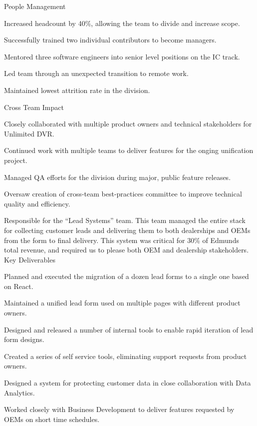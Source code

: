 \documentclass[]{deedy-resume-openfont}
\begin{document}
\sectionsep
People Management
\begin{tightemize}
\item Increased headcount by 40\%, allowing the team to divide and increase scope.
\item Successfully trained two individual contributors to become managers.
\item Mentored three software engineers into senior level positions on the IC track.
\item Led team through an unexpected transition to remote work.
\item Maintained lowest attrition rate in the division.
\end{tightemize}
\sectionsep

Cross Team Impact
\begin{tightemize}
\item Closely collaborated with multiple product owners and technical stakeholders for Unlimited DVR.
\item Continued work with multiple teams to deliver features for the onging unification project.
\item Managed QA efforts for the division during major, public feature releases.
\item Oversaw creation of cross-team best-practices committee to improve technical quality and efficiency.
\end{tightemize}
\sectionsep

\vspace{\topsep}
Responsible for the ``Lead Systems'' team. This team managed the entire stack for collecting customer leads and delivering them to both dealerships and OEMs from the form to final delivery. This system was critical for 30\% of Edmunds total revenue, and required us to please both OEM and dealership stakeholders.
\vspace{\topsep}
\newline
Key Deliverables
\begin{tightemize}
\item Planned and executed the migration of a dozen lead forms to a single one based on React.
\item Maintained a unified lead form used on multiple pages with different product owners.
\item Designed and released a number of internal tools to enable rapid iteration of lead form designs.
\item Created a series of self service tools, eliminating support requests from product owners.
\item Designed a system for protecting customer data in close collaboration with Data Analytics.
\item Worked closely with Business Development to deliver features requested by OEMs on short time schedules.
\end{tightemize}
\end{document}
